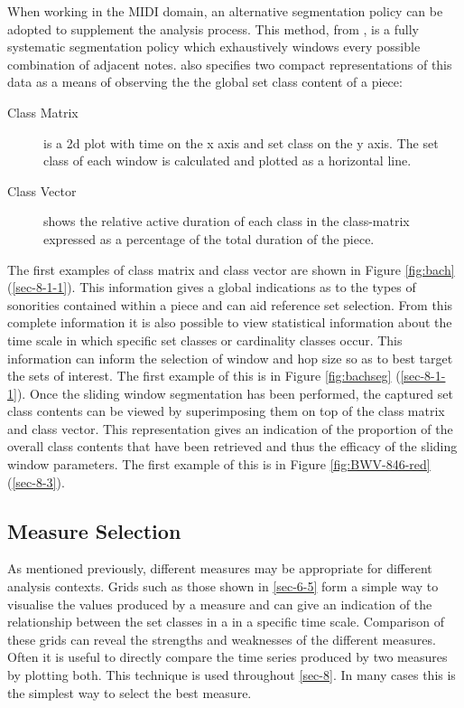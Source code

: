 \documentclass{article}
\begin{document}
When working in the MIDI domain, an alternative segmentation policy
can be adopted to supplement the analysis process. This method, from
\citet[chap. 5.3]{Martorell2013}, is a fully systematic segmentation
policy which exhaustively windows every possible combination of
adjacent notes. \citet[chap. 5.3.5]{Martorell2013} also specifies two
compact representations of this data as a means of observing the the
global set class content of a piece:
\begin{description}
\item[Class Matrix] is a 2d plot with time on the x axis and set class 
on the y axis. The set class of each window is calculated and plotted 
as a horizontal line.
\item[Class Vector] 
shows the relative active duration of each class in the class-matrix 
expressed as a percentage of the total duration of the piece.
\end{description}

The first examples of class matrix and class vector are shown in
Figure \ref{fig:bach} (\ref{sec-8-1-1}). This information gives a global
indications as to the types of sonorities contained within a piece and
can aid reference set selection. From this complete information it is
also possible to view statistical information about the time scale in
which specific set classes or cardinality classes occur. This
information can inform the selection of window and hop size so as to
best target the sets of interest. The first example of this is in
Figure \ref{fig:bachseg} (\ref{sec-8-1-1}). Once the sliding window
segmentation has been performed, the captured set class contents can
be viewed by superimposing them on top of the class matrix and class
vector. This representation gives an indication of the proportion of
the overall class contents that have been retrieved and thus the
efficacy of the sliding window parameters. The first example of this
is in Figure \ref{fig:BWV-846-red} (\ref{sec-8-3}).
\subsection{Measure Selection}
\label{sec-7-4}

As mentioned previously, different measures may be appropriate for different analysis contexts. Grids
such as those shown in \ref{sec-6-5} form a simple way to
visualise the values produced by a measure and can give an indication
of the relationship between the set classes in a in a specific time
scale. Comparison of these grids can reveal the strengths and
weaknesses of the different measures. Often it is useful to directly
compare the time series produced by two measures by plotting
both. This technique is used throughout \ref{sec-8}. In many
cases this is the simplest way to select the best measure.
\end{document}
